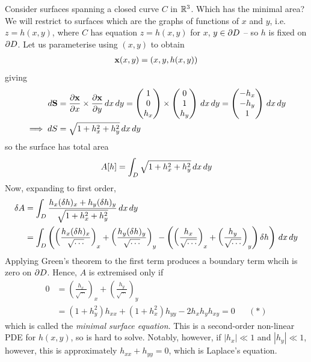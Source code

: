 \documentclass{../template/note}
\begin{document}
    Consider surfaces spanning a closed curve $C$ in $\mathbb R^3$. Which has the minimal area? We will restrict to surfaces which are the graphs of functions of $x$ and $y$, i.e. $z = h(x, y)$, where $C$ has equation $z = h(x, y)$ for $x$, $y \in \partial D$ -- so $h$ is fixed on $\partial D$. Let us parameterise using $(x, y)$ to obtain
    \begin{align*}
        \V x(x, y) = (x, y, h(x,y)) 
    \end{align*}
    giving
    \begin{align*}
        d \V S &= \pd{\V x}{x} \times \pd{\V x}{y} \D x \D y = \begin{pmatrix}
            1 \\
            0 \\
            h_x \\
        \end{pmatrix} \times \begin{pmatrix}
            0 \\
            1 \\
            h_y \\
        \end{pmatrix}\D x \D y = \begin{pmatrix}
            -h_x \\
            -h_y \\
            1 \\
        \end{pmatrix} \D x \D y \\
        \implies dS &= \sqrt{1+h_x^2+h_y^2} \D x \D y
    \end{align*}
    so the surface has total area
    \begin{align*}
        A[h] = \int_D \sqrt{1+h_x^2+h_y^2} \,d{x} \,d{y}
    \end{align*}
    Now, expanding to first order,
    \begin{align*}
        \delta A &= \int_D \frac{h_x(\delta h)_x + h_y(\delta h)_y}{\sqrt{1+h_x^2+h_y^2}} \,d{x} \,d{y} \\
        &= \int_D \left(\left(\frac{h_x(\delta h)_x}{\sqrt{\cdots}}\right)_x + \left(\frac{h_y(\delta h)_y}{\sqrt{\cdots}}\right)_y - \left(\left(\frac{h_x}{\sqrt{\cdots}}\right)_x + \left(\frac{h_y}{\sqrt{\cdots}}\right)_y\right)\delta h\right)\,d{x} \,d{y}
    \end{align*}
    Applying Green's theorem to the first term produces a boundary term whcih is zero on $\partial D$. Hence, $A$ is extremised only if
    \begin{align*}
        0 &= \left(\frac{h_x}{\sqrt{\cdots}}\right)_x + \left(\frac{h_y}{\sqrt{\cdots}}\right)_y \\
        &= (1+h_y^2) h_{xx} + (1+h_x^2) h_{yy} - 2h_xh_yh_{xy} = 0 && (*)
    \end{align*}
    which is called the \emph{minimal surface equation}. This is a second-order non-linear PDE for $h(x, y)$, so is hard to solve. Notably, however, if $|h_x| \ll 1$ and $|h_y| \ll 1$, however, this is approximately $h_{xx} + h_{yy} = 0$, which is Laplace's equation.
    
\end{document}
